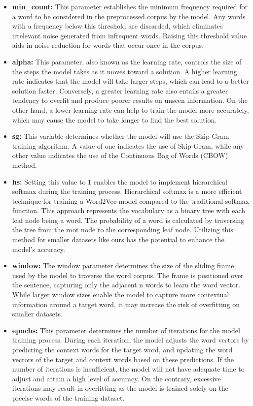 \documentclass[english,bachelor]{swsLeipzig}
\begin{document}
\begin{itemize}
  \item \textbf{min\_count:} This parameter establishes the minimum frequency required for a word to be considered in 
  the preprocessed corpus by the model.  Any words with a frequency below this threshold are discarded, which eliminates irrelevant noise generated from infrequent words. Raising this threshold value aids in noise reduction for words that occur once in the corpus.
  \item \textbf{alpha:} This parameter, also known as the learning rate, controls the size of the steps the model 
  takes as it moves toward a solution. A higher learning rate indicates that the model will take larger steps, which can lead to a better solution faster. Conversely, a greater learning rate also entails a greater tendency to overfit and produce poorer results on unseen information. On the other hand, a lower learning rate can help to train the model more accurately, which may cause the model to take longer to find the best solution.
  \item \textbf{sg:} This variable determines whether the model will use the Skip-Gram training algorithm. A value of one indicates the use of Skip-Gram, while any other value indicates the use of the Continuous Bag of Words (CBOW) method.
  \item \textbf{hs:} Setting this value to 1 enables the model to implement hierarchical softmax during the training process. Hierarchical softmax is a more efficient technique for training a Word2Vec model compared to the traditional softmax function. This approach represents the vocabulary as a binary tree with each leaf node being a word. The probability of a word is calculated by traversing the tree from the root node to the corresponding leaf node. Utilizing this method for smaller datasets like ours has the potential to enhance the model's accuracy.
  \item \textbf{window:} The window parameter determines the size of the sliding frame used by the model to traverse the word corpus. The frame is positioned over the sentence, capturing only the adjacent n words to learn the word vector. While larger window sizes enable the model to capture more contextual information around a target word, it may increase the risk of overfitting on smaller datasets.
  \item \textbf{epochs:} This parameter determines the number of iterations for the model training process. During each iteration, the model adjusts the word vectors by predicting the context words for the target word, and updating the word vectors of the target and context words based on these predictions. If the number of iterations is insufficient, the model will not have adequate time to adjust and attain a high level of accuracy. On the contrary, excessive iterations may result in overfitting as the model is trained solely on the precise words of the training dataset.
\end{itemize}
\end{document}
